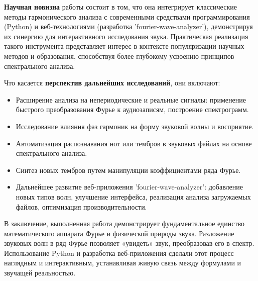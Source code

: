 \documentclass[bachelor, och, diploma]{SCWorks}
\begin{document}
\textbf{Научная новизна} работы состоит в том, что она интегрирует классические методы гармонического анализа с современными средствами программирования (Python) и веб-технологиями (разработка 'fourier-wave-analyzer'), демонстрируя их синергию для интерактивного исследования звука. Практическая реализация такого инструмента представляет интерес в контексте популяризации научных методов и образования, способствуя более глубокому усвоению принципов спектрального анализа.

Что касается \textbf{перспектив дальнейших исследований}, они включают:
\begin{itemize}
  \item Расширение анализа на непериодические и реальные сигналы: применение быстрого преобразования Фурье к аудиозаписям, построение спектрограмм.
  \item Исследование влияния фаз гармоник на форму звуковой волны и восприятие.
  \item Автоматизация распознавания нот или тембров в звуковых файлах на основе спектрального анализа.
  \item Синтез новых тембров путем манипуляции коэффициентами ряда Фурье.
  \item Дальнейшее развитие веб-приложения 'fourier-wave-analyzer': добавление новых типов волн, улучшение интерфейса, реализация анализа загружаемых файлов, оптимизация производительности.
\end{itemize}

В заключение, выполненная работа демонстрирует фундаментальное единство математического аппарата Фурье и физической природы звука. Разложение звуковых волн в ряд Фурье позволяет «увидеть» звук, преобразовав его в спектр. Использование Python и разработка веб-приложения сделали этот процесс наглядным и интерактивным, устанавливая живую связь между формулами и звучащей реальностью.

\end{document}
